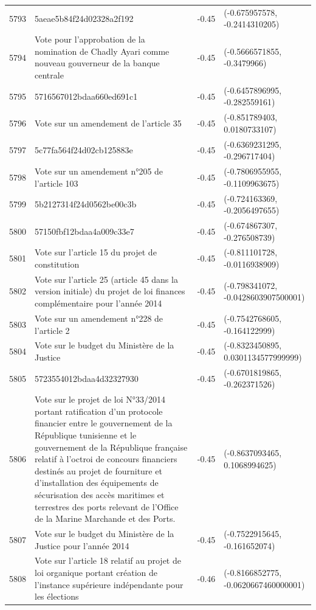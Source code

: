 \begin{table}[ht]
\begin{tabular}{rlrl}
  5793 & 5aeae5b84f24d02328a2f192 & -0.45 & (-0.675957578, -0.2414310205) \\ 
  5794 & Vote pour l'approbation de la nomination de Chadly Ayari comme nouveau gouverneur de la banque centrale & -0.45 & (-0.5666571855, -0.3479966) \\ 
  5795 & 5716567012bdaa660ed691c1 & -0.45 & (-0.6457896995, -0.282559161) \\ 
  5796 & Vote sur un amendement de l'article 35 & -0.45 & (-0.851789403, 0.0180733107) \\ 
  5797 & 5c77fa564f24d02cb125883e & -0.45 & (-0.6369231295, -0.296717404) \\ 
  5798 & Vote sur un amendement n°205 de l'article 103 & -0.45 & (-0.7806955955, -0.1109963675) \\ 
  5799 & 5b2127314f24d0562be00c3b & -0.45 & (-0.724163369, -0.2056497655) \\ 
  5800 & 57150fbf12bdaa4a009c33e7 & -0.45 & (-0.674867307, -0.276508739) \\ 
  5801 & Vote sur l'article 15 du projet de constitution & -0.45 & (-0.811101728, -0.0116938909) \\ 
  5802 & Vote sur l'article 25 (article 45 dans la version initiale) du projet de loi finances complémentaire pour l'année 2014 & -0.45 & (-0.798341072, -0.0428603907500001) \\ 
  5803 & Vote sur un amendement n°228 de l'article 2 & -0.45 & (-0.7542768605, -0.164122999) \\ 
  5804 & Vote sur le budget du Ministère de la Justice & -0.45 & (-0.8323450895, 0.0301134577999999) \\ 
  5805 & 5723554012bdaa4d32327930 & -0.45 & (-0.6701819865, -0.262371526) \\ 
  5806 & Vote sur le projet de loi N°33/2014 portant ratification d'un protocole financier entre le gouvernement de la République tunisienne et le gouvernement de la République française relatif à l'octroi de concours financiers destinés au projet de fourniture et d'installation des équipements de sécurisation des accès maritimes et terrestres des ports relevant de l'Office de la Marine Marchande et des Ports. & -0.45 & (-0.8637093465, 0.1068994625) \\ 
  5807 & Vote sur le budget du Ministère de la Justice pour l'année 2014 & -0.45 & (-0.7522915645, -0.161652074) \\ 
  5808 & Vote sur l'article 18 relatif au projet de loi organique portant création de l'instance supérieure indépendante pour les élections & -0.46 & (-0.8166852775, -0.0620667460000001) \\ 

\end{tabular}
\end{table}
